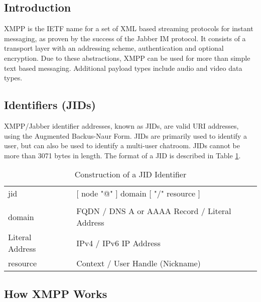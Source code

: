
\subsection{Introduction}

XMPP is the IETF name for a set of XML based streaming protocols for
instant messaging, as proven by the success of the Jabber IM protocol.
It consists of a transport layer with an addressing scheme, 
authentication and optional encryption. Due to these abstractions, XMPP 
can be used for more than simple text based messaging. Additional 
payload types include audio and video data types.

\subsection{Identifiers (JIDs)}

XMPP/Jabber identifier addresses, known as JIDs, are valid URI 
addresses, using the Augmented Backus-Naur Form. JIDs are primarily used 
to identify a user, but can also be used to identify a multi-user 
chatroom. JIDs cannot be more than 3071 bytes in length. The format of a
JID is described in Table \ref{tab:jid}.

\begin{table}[p]

\label{tab:jid}

\begin{center}

\begin{tabular}{lll}
jid		&		&	[ node "@" ] domain [ "/" resource ]				\\
			&		&																	\\
domain	&		&	FQDN / DNS A or AAAA Record / Literal Address	\\
Literal Address	&		&	IPv4 / IPv6 IP Address						\\
resource &		&	Context / User Handle (Nickname)						\\
\end{tabular}

\end{center}

\caption{Construction of a JID Identifier}

\end{table}

\subsection{How XMPP Works}


